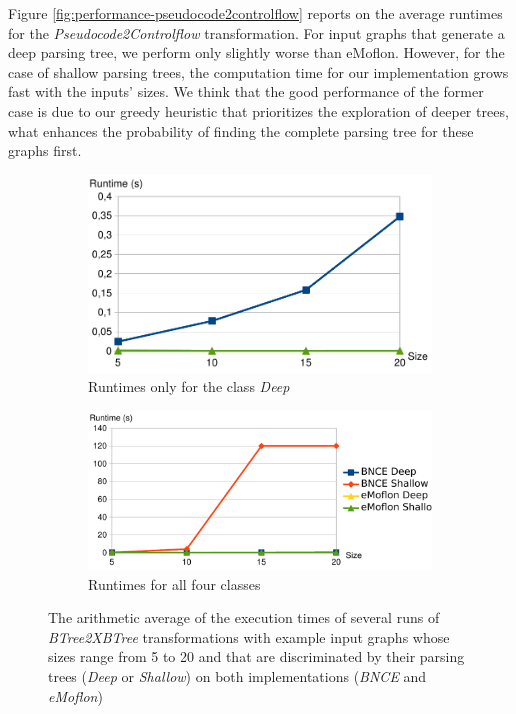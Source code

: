 Figure \ref{fig:performance-pseudocode2controlflow} reports on the average runtimes for the \emph{Pseudocode2Controlflow} transformation. For input graphs that generate a deep parsing tree, we perform only slightly worse than eMoflon. However, for the case of shallow parsing trees, the computation time for our implementation grows fast with the inputs' sizes. We think that the good performance of the former case is due to our greedy heuristic that prioritizes the exploration of deeper trees, what enhances the probability of finding the complete parsing tree for these graphs first.

\begin{figure}
	\begin{subfigure}[t]{0.44\textwidth}
		\centering
		\includegraphics[width=\textwidth]{figures/performance/btree2xbtree-deep}
		\caption{Runtimes only for the class \emph{Deep}}
		\label{fig:performance-btree2xbtree-deep}
	\end{subfigure}
	\begin{subfigure}[t]{0.55\textwidth}
		\centering
		\includegraphics[width=\textwidth]{figures/performance/btree2xbtree}
		\caption{Runtimes for all four classes}
		\label{fig:performance-btree2xbtree}
	\end{subfigure}
	\caption{The arithmetic average of the execution times of several runs of \emph{BTree2XBTree} transformations with example input graphs whose sizes range from 5 to 20 and that are discriminated by their parsing trees (\emph{Deep} or \emph{Shallow}) on both implementations (\emph{BNCE} and \emph{eMoflon})}
\end{figure}

